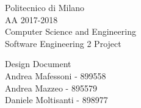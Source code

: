 
\usepackage{graphicx}
\usepackage{listings}
\renewcommand\textfraction{.1}
\usepackage{booktabs}

	
	
	\begin{titlepage}
		
		\begin{figure}[t]
			\centering
		\end{figure}
		\begin{center}
			Politecnico di Milano\\AA 2017-2018\\
			\vspace{7mm}
			Computer Science and Engineering\\
			\huge Software Engineering 2 Project
		\end{center}
		
		\begin{figure}[!h]
			\centering
		\end{figure}
		
		\begin{center}
			\fontsize{7mm}{10mm}\selectfont Design Document \\
			\vspace{7mm}
			\small Andrea Mafessoni - 899558\\
			Andrea Mazzeo - 895579\\
			Daniele Moltisanti - 898977
		\end{center}
		
	\end{titlepage}
	
